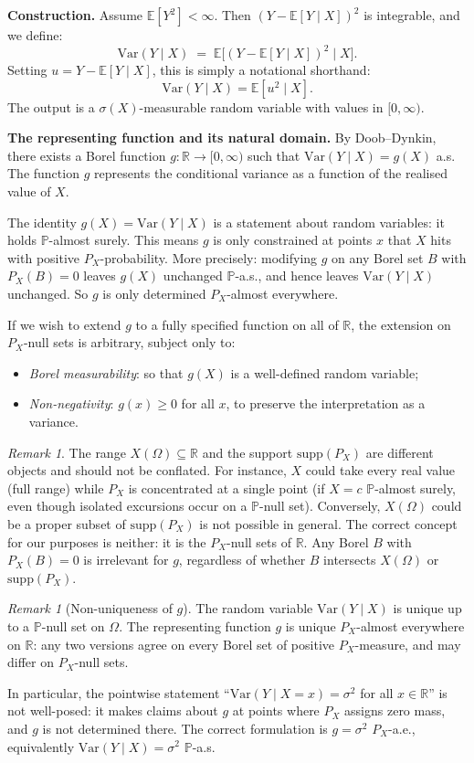 \documentclass[a4paper,oneside,12pt]{extarticle}
\theoremstyle{plain}
\theoremstyle{definition}
\theoremstyle{remark}
\newtheorem{remark}[proposition]{Remark}
\newcommand*{\E}{\mathbb{E}}
\newcommand*{\Var}{\mathrm{Var}}
\newcommand*{\mP}{\mathbb{P}}
\newcommand*{\mR}{\mathbb{R}}
\begin{document}
\textbf{Construction.}
Assume $\E[Y^2] < \infty$. Then $(Y - \E[Y \mid X])^2$ is integrable,
and we define:
\[
  \Var(Y \mid X) \;=\; \E\bigl[(Y - \E[Y \mid X])^2 \;\big|\; X\bigr].
\]
Setting $u = Y - \E[Y \mid X]$, this is simply a notational shorthand:
\[
  \Var(Y \mid X) = \E[u^2 \mid X].
\]
The output is a $\sigma(X)$-measurable random variable with values in
$[0,\infty)$.

\textbf{The representing function and its natural domain.}
By Doob--Dynkin, there exists a Borel function $g:\mR\to[0,\infty)$
such that $\Var(Y\mid X) = g(X)$ a.s. The function $g$ represents the
conditional variance as a function of the realised value of $X$.

The identity $g(X) = \Var(Y \mid X)$ is a statement about random
variables: it holds $\mP$-almost surely. This means $g$ is only
constrained at points $x$ that $X$ hits with positive $P_X$-probability.
More precisely: modifying $g$ on any Borel set $B$ with $P_X(B) = 0$
leaves $g(X)$ unchanged $\mP$-a.s., and hence leaves $\Var(Y\mid X)$
unchanged. So $g$ is only determined $P_X$-almost everywhere.

If we wish to extend $g$ to a fully specified function on all of $\mR$,
the extension on $P_X$-null sets is arbitrary, subject only to:
\begin{itemize}
  \item \emph{Borel measurability}: so that $g(X)$ is a well-defined
        random variable;
  \item \emph{Non-negativity}: $g(x) \geq 0$ for all $x$, to preserve
        the interpretation as a variance.
\end{itemize}

\begin{remark}
The range $X(\Omega) \subseteq \mR$ and the support $\mathrm{supp}(P_X)$
are different objects and should not be conflated. For instance, $X$
could take every real value (full range) while $P_X$ is concentrated at
a single point (if $X = c$ $\mP$-almost surely, even though isolated
excursions occur on a $\mP$-null set). Conversely, $X(\Omega)$ could be
a proper subset of $\mathrm{supp}(P_X)$ is not possible in general.
The correct concept for our purposes is neither: it is the
$P_X$-null sets of $\mR$. Any Borel $B$ with $P_X(B) = 0$ is
irrelevant for $g$, regardless of whether $B$ intersects $X(\Omega)$
or $\mathrm{supp}(P_X)$.
\end{remark}

\begin{remark}[Non-uniqueness of $g$]
The random variable $\Var(Y \mid X)$ is unique up to a $\mP$-null set
on $\Omega$. The representing function $g$ is unique $P_X$-almost
everywhere on $\mR$: any two versions agree on every Borel set of
positive $P_X$-measure, and may differ on $P_X$-null sets.

In particular, the pointwise statement ``$\Var(Y \mid X = x) = \sigma^2$
for all $x \in \mR$'' is not well-posed: it makes claims about $g$ at
points where $P_X$ assigns zero mass, and $g$ is not determined there.
The correct formulation
is $g = \sigma^2$ $P_X$-a.e., equivalently $\Var(Y \mid X) = \sigma^2$
$\mP$-a.s.
\end{remark}
\end{document}

